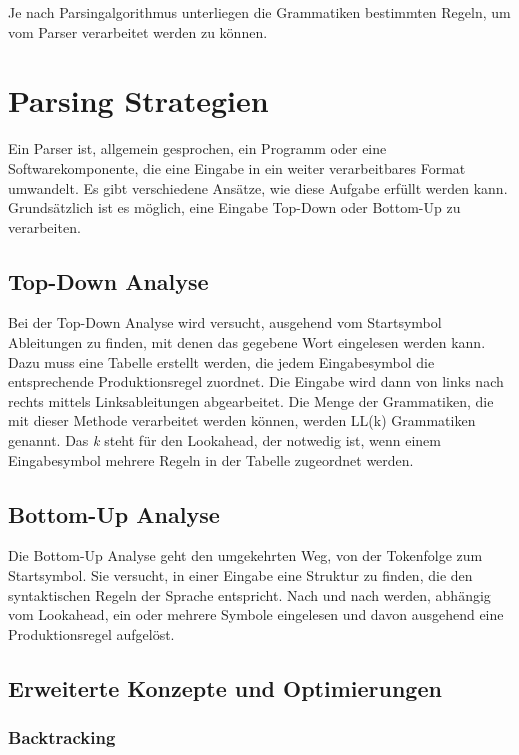 Je nach Parsingalgorithmus unterliegen die Grammatiken bestimmten Regeln, um vom Parser verarbeitet werden zu können.


\section{Parsing Strategien}
\label{theorie_parsing_strategien}

Ein Parser ist, allgemein gesprochen, ein Programm oder eine Softwarekomponente, die eine Eingabe in ein weiter verarbeitbares Format umwandelt. Es gibt verschiedene Ansätze, wie diese Aufgabe erfüllt werden kann. Grund\-sätz\-lich ist es möglich, eine Eingabe Top-Down oder Bottom-Up zu verarbeiten.

\subsection{Top-Down Analyse}

Bei der Top-Down Analyse wird versucht, ausgehend vom Startsymbol Ab\-lei\-tun\-gen zu finden, mit denen das gegebene Wort eingelesen werden kann. Dazu muss eine Tabelle erstellt werden, die jedem Eingabesymbol die ent\-sprech\-en\-de Produktionsregel zuordnet. Die Eingabe wird dann von links nach rechts mittels Linksableitungen abgearbeitet. Die Menge der Grammatiken, die mit dieser Methode verarbeitet werden können, werden LL(k) Grammatiken genannt. Das \emph{k} steht für den Lookahead, der notwedig ist, wenn einem Eingabesymbol mehrere Regeln in der Tabelle zugeordnet werden.


\subsection{Bottom-Up Analyse}

Die Bottom-Up Analyse geht den umgekehrten Weg, von der Tokenfolge zum Startsymbol. Sie versucht, in einer Eingabe eine Struktur zu finden, die den syntaktischen Regeln der Sprache entspricht. Nach und nach werden, abhängig vom Lookahead, ein oder mehrere Symbole eingelesen und davon ausgehend eine Produktionsregel aufgelöst.


\subsection{Erweiterte Konzepte und Optimierungen}
\label{theorie_erweiterte_konzepte}

\subsubsection{Backtracking} 

